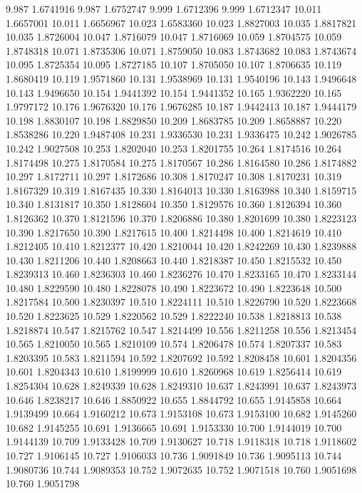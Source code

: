 9.987 1.6741916
9.987 1.6752747
9.999 1.6712396
9.999 1.6712347
10.011 1.6657001
10.011 1.6656967
10.023 1.6583360
10.023 1.8827003
10.035 1.8817821
10.035 1.8726004
10.047 1.8716079
10.047 1.8716069
10.059 1.8704575
10.059 1.8748318
10.071 1.8735306
10.071 1.8759050
10.083 1.8743682
10.083 1.8743674
10.095 1.8725354
10.095 1.8727185
10.107 1.8705050
10.107 1.8706635
10.119 1.8680419
10.119 1.9571860
10.131 1.9538969
10.131 1.9540196
10.143 1.9496648
10.143 1.9496650
10.154 1.9441392
10.154 1.9441352
10.165 1.9362220
10.165 1.9797172
10.176 1.9676320
10.176 1.9676285
10.187 1.9442413
10.187 1.9444179
10.198 1.8830107
10.198 1.8829850
10.209 1.8683785
10.209 1.8658887
10.220 1.8538286
10.220 1.9487408
10.231 1.9336530
10.231 1.9336475
10.242 1.9026785
10.242 1.9027508
10.253 1.8202040
10.253 1.8201755
10.264 1.8174516
10.264 1.8174498
10.275 1.8170584
10.275 1.8170567
10.286 1.8164580
10.286 1.8174882
10.297 1.8172711
10.297 1.8172686
10.308 1.8170247
10.308 1.8170231
10.319 1.8167329
10.319 1.8167435
10.330 1.8164013
10.330 1.8163988
10.340 1.8159715
10.340 1.8131817
10.350 1.8128604
10.350 1.8129576
10.360 1.8126394
10.360 1.8126362
10.370 1.8121596
10.370 1.8206886
10.380 1.8201699
10.380 1.8223123
10.390 1.8217650
10.390 1.8217615
10.400 1.8214498
10.400 1.8214619
10.410 1.8212405
10.410 1.8212377
10.420 1.8210044
10.420 1.8242269
10.430 1.8239888
10.430 1.8211206
10.440 1.8208663
10.440 1.8218387
10.450 1.8215532
10.450 1.8239313
10.460 1.8236303
10.460 1.8236276
10.470 1.8233165
10.470 1.8233144
10.480 1.8229590
10.480 1.8228078
10.490 1.8223672
10.490 1.8223648
10.500 1.8217584
10.500 1.8230397
10.510 1.8224111
10.510 1.8226790
10.520 1.8223668
10.520 1.8223625
10.529 1.8220562
10.529 1.8222240
10.538 1.8218813
10.538 1.8218874
10.547 1.8215762
10.547 1.8214499
10.556 1.8211258
10.556 1.8213454
10.565 1.8210050
10.565 1.8210109
10.574 1.8206478
10.574 1.8207337
10.583 1.8203395
10.583 1.8211594
10.592 1.8207692
10.592 1.8208458
10.601 1.8204356
10.601 1.8204343
10.610 1.8199999
10.610 1.8260968
10.619 1.8256414
10.619 1.8254304
10.628 1.8249339
10.628 1.8249310
10.637 1.8243991
10.637 1.8243973
10.646 1.8238217
10.646 1.8850922
10.655 1.8844792
10.655 1.9145858
10.664 1.9139499
10.664 1.9160212
10.673 1.9153108
10.673 1.9153100
10.682 1.9145260
10.682 1.9145255
10.691 1.9136665
10.691 1.9153330
10.700 1.9144019
10.700 1.9144139
10.709 1.9133428
10.709 1.9130627
10.718 1.9118318
10.718 1.9118602
10.727 1.9106145
10.727 1.9106033
10.736 1.9091849
10.736 1.9095113
10.744 1.9080736
10.744 1.9089353
10.752 1.9072635
10.752 1.9071518
10.760 1.9051698
10.760 1.9051798
